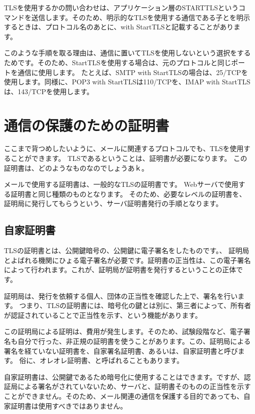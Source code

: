 TLSを使用するかの問い合わせは、アプリケーション層のSTARTTLSというコマンドを送信します。そのため、明示的なTLSを使用する通信である子とを明示するときは、プロトコル名のあとに、with StartTLSと記載することがあります。

このような手順を取る理由は、通信に置いてTLSを使用しないという選択をするためです。そのため、StartTLSを使用する場合は、元のプロトコルと同じポートを通信に使用します。
たとえば、SMTP with StartTLSの場合は、25/TCPを使用します。同様に、POP3 with StartTLSは110/TCPを、IMAP with StartTLSは、143/TCPを使用します。

\section{通信の保護のための証明書}

ここまで背つめしたいように、メールに関連するプロトコルでも、TLSを使用することができます。
TLSであるということは、証明書が必要になります。
この証明書は、どのようなものなのでしょうあｋ。

メールで使用する証明書は、一般的なTLSの証明書です。
Webサーバで使用する証明書と同じ種類のものとなります。
そのため、必要なレベルの証明書を、証明局に発行してもらうという、サーバ証明書発行の手順となります。

\subsection{自家証明書}

TLSの証明書とは、公開鍵暗号の、公開鍵に電子署名をしたものです。、
証明局とよばれる機関にひょる電子署名が必要です。証明書の正当性は、この電子署名によって行われます。これが、証明局が証明書を発行するということの正体です。

証明局は、発行を依頼する個人、団体の正当性を確認した上で、署名を行います。
つまり、TLSの証明書には、暗号化の鍵とは別に、第三者によって、所有者が認証されていることで正当性を示す、という機能があります。

この証明局による証明は、費用が発生します。そのため、試験段階など、電子署名も自分で行った、非正規の証明書を使うことがあります。この、証明局による署名を経ていない証明書を、自家署名証明書、あるいは、自家証明書と呼びます。
俗に、オレオレ証明書、と呼ばれることもあります。

自家証明書は、公開鍵であるため暗号化に使用することはできます。ですが、認証局による署名がされていないため、サーバと、証明書そのものの正当性を示すことができません。そのため、メール関連の通信を保護する目的であっても、自家証明書は使用すべきではありません。

